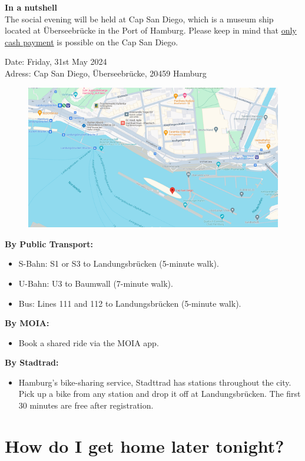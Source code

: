 \textbf{In a nutshell} \\
The social evening will be held at Cap San Diego, 
which is a museum ship located at Überseebrücke in the Port of Hamburg. 
Please keep in mind that \underline{only cash payment} is possible on the Cap San Diego. 

Date: Friday, 31st May 2024 \\
Adress: Cap San Diego, Überseebrücke, 20459 Hamburg
\begin{figure}[H]
	\centering
	\includegraphics[width=\textwidth]{tex/images/social_event/social_event_karte.png}
\end{figure}

\textbf{By Public Transport:}
\begin{itemize}
	\item S-Bahn: S1 or S3 to Landungsbrücken (5-minute walk).
	\item U-Bahn: U3 to Baumwall (7-minute walk).
	\item Bus: Lines 111 and 112 to Landungsbrücken (5-minute walk).
\end{itemize}

\textbf{By MOIA:}
\begin{itemize}
	\item Book a shared ride via the MOIA app.
\end{itemize}

\textbf{By Stadtrad:}
\begin{itemize}
	\item Hamburg’s bike-sharing service, Stadttrad has stations throughout the city. Pick up a bike from any station and drop it off at Landungsbrücken. The first 30 minutes are free after registration.
\end{itemize}

\newpage

\section*{How do I get home later tonight?}

